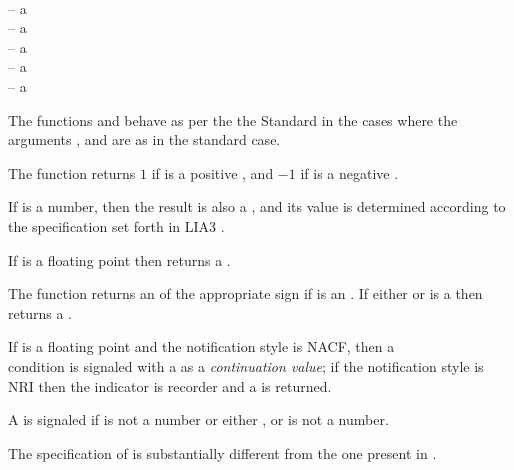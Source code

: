 \documentclass[../Comparisons-Predicates.tex]{subfiles}
\begin{document}
  
  
  \DSyntax{}
  
    \RArrow {}\\
     
  \RArrow {}
  
  
  \DArgsNValues{}
  
   -- a \\
   -- a \\
   -- a \\
   -- a \\
   -- a 
  
  
  \DDescription{}
  
  The functions  and  behave as per the
  the \CL{} Standard \cite{1994:ANSICL} in the cases where the arguments
  ,  and  are as in the standard case.
  
  The  function returns $1$ if  is a positive
  , and  $-1$ if  is a negative
  .
  
  If  is a  number, then the result
   is also a , and its
  value is determined according to the specification set forth in LIA3
  \cite{2004:LIA3}.
  
  If  is a floating point  then
   returns a .
  
  The function  returns an  of the
  appropriate sign if  is an .  If
  either  or  is a  then
   returns a .
  
  \DExceptional{}
  
  If  is a floating point  and the
  notification style is NACF, then a\\
   condition is signaled with a
   as a \emph{continuation value}; if the
  notification style is NRI then the indicator  is
  recorder and a  is returned.
  
  A  is signaled if  is not a number or
  either , or  is not a  number.
  
  
  \DNotes{}
  
  The specification of  is substantially different from the
  one present in \cite{1994:ANSICL}.
  
\end{document}

